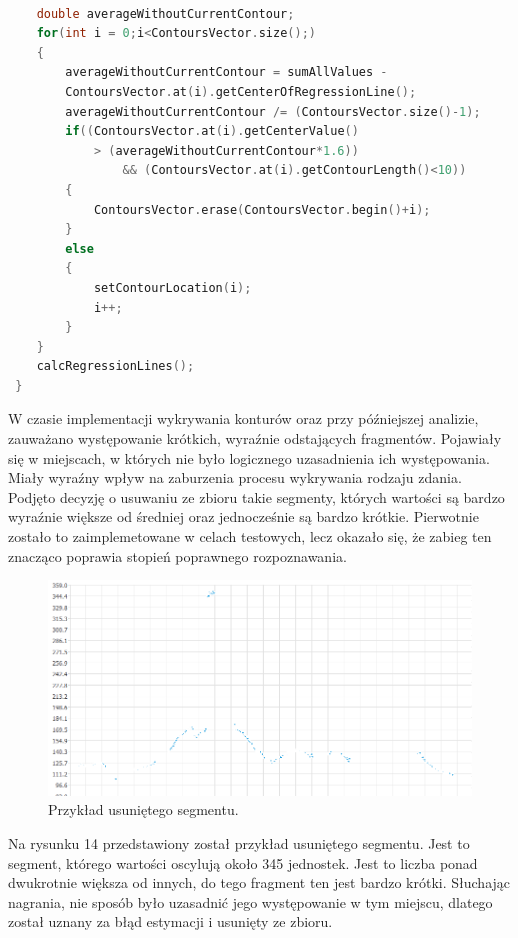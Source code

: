 \documentclass[a4paper,12 pt]{article}
\begin{document}
\begin{lstlisting}[caption={Dalsza część głównej funkcji findContours},label={lst:label},language=C++]

    double averageWithoutCurrentContour;
    for(int i = 0;i<ContoursVector.size();)
    {
        averageWithoutCurrentContour = sumAllValues - 
        ContoursVector.at(i).getCenterOfRegressionLine();
        averageWithoutCurrentContour /= (ContoursVector.size()-1);
        if((ContoursVector.at(i).getCenterValue() 
        	> (averageWithoutCurrentContour*1.6))
                && (ContoursVector.at(i).getContourLength()<10))
        {
            ContoursVector.erase(ContoursVector.begin()+i);
        }
        else
        {
            setContourLocation(i);
            i++;
        }
    }
    calcRegressionLines();
 }
\end{lstlisting}
W czasie implementacji wykrywania konturów oraz przy późniejszej analizie, zauważano występowanie krótkich, wyraźnie odstających fragmentów. Pojawiały się w miejscach, w których nie było logicznego uzasadnienia ich występowania. Miały wyraźny wpływ na zaburzenia procesu wykrywania rodzaju zdania.
Podjęto decyzję o usuwaniu ze zbioru takie segmenty, których wartości są bardzo wyraźnie większe od średniej oraz jednocześnie są bardzo krótkie. Pierwotnie zostało to zaimplemetowane w celach testowych, lecz okazało się, że zabieg ten znacząco poprawia stopień poprawnego rozpoznawania.
 \FloatBarrier
\begin{figure}[h]
\centering
\includegraphics[scale=0.7]{usuniety_kontur.png}
\caption{Przykład usuniętego segmentu.}
\end{figure}
\FloatBarrier
Na rysunku 14 przedstawiony został przykład usuniętego segmentu. Jest to segment, którego wartości oscylują około 345 jednostek. Jest to liczba ponad dwukrotnie większa od innych, do tego fragment ten jest bardzo krótki.
Słuchając nagrania, nie sposób było uzasadnić jego występowanie w tym miejscu, dlatego został uznany za błąd estymacji i usunięty ze zbioru. 
\end{document}

